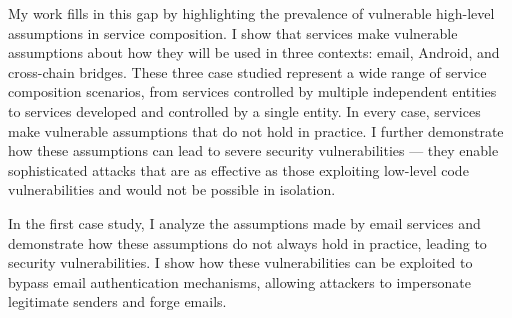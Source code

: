 \begin{dissertationintroduction}


My work fills in this gap by highlighting the prevalence of vulnerable high-level assumptions in service composition. I show that services make vulnerable assumptions about how they will be used in three contexts: email, Android, and cross-chain bridges. These three case studied represent a wide range of service composition scenarios, from services controlled by multiple independent entities to services developed and controlled by a single entity. In every case, services make vulnerable assumptions that do not hold in practice. I further demonstrate how these assumptions can lead to severe security vulnerabilities --- they enable sophisticated attacks that are as effective as those exploiting low-level code vulnerabilities and would not be possible in isolation. 





In the first case study, I analyze the assumptions made by email services and demonstrate how these assumptions do not always hold in practice, leading to security vulnerabilities. I show how these vulnerabilities can be exploited to bypass email authentication mechanisms, allowing attackers to impersonate legitimate senders and forge emails.


\end{dissertationintroduction}
